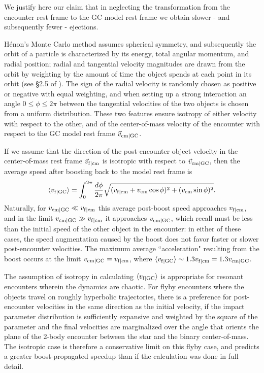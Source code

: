 \documentclass[twocolumn,linenumbers]{aastex631}
\begin{document}
We justify here our claim that in neglecting the transformation from the encounter rest frame to the GC model rest frame we obtain slower - and subsequently fewer - ejections.

H\'enon's Monte Carlo method assumes spherical symmetry, and subsequently the orbit of a particle is characterized by its energy, total angular momentum, and radial position; radial and tangential velocity magnitudes are drawn from the orbit by weighting by the amount of time the object spends at each point in its orbit (see \S2.5 of \citet{Rodriguez2022}).
The sign of the radial velocity is randomly chosen as positive or negative with equal weighting, and when setting up a strong interaction an angle $0 \le \phi \le 2\pi$ between the tangential velocities of the two objects is chosen from a uniform distribution.
These two features ensure isotropy of either velocity with respect to the other, and of the center-of-mass velocity of the encounter with respect to the GC model rest frame $\vec{v}_{\rm cm|GC}$.

If we assume that the direction of the post-encounter object velocity in the center-of-mass rest frame $\vec{v}_{\rm f|cm}$ is isotropic with respect to $\vec{v}_{\rm cm|GC}$, then the average speed after boosting back to the model rest frame is
\begin{equation}
    \langle v_{\rm f|GC} \rangle
    = \int_0^{2\pi} \frac{d\phi}{2\pi} \sqrt{(v_{\rm f|cm} + v_{\rm cm} \cos \phi)^2 + (v_{\rm cm} \sin \phi)^2}.
\end{equation}
Naturally, for $v_{\rm cm|GC} \ll v_{\rm f|cm}$ this average post-boost speed approaches $v_{\rm f|cm}$, and in the limit $v_{\rm cm|GC} \gg v_{\rm f|cm}$ it approaches $v_{\rm cm|GC}$, which recall must be less than the initial speed of the other object in the encounter: in either of these cases, the speed augmentation caused by the boost does not favor faster or slower post-encounter velocities.
The maximum average ``acceleration" resulting from the boost occurs at the limit $v_{\rm cm|GC} = v_{\rm f|cm}$, where $\langle v_{\rm f|GC} \rangle \sim 1.3 v_{\rm f|cm} = 1.3 v_{\rm cm|GC}$.

The assumption of isotropy in calculating $\langle v_{\rm f|GC} \rangle$ is appropriate for resonant encounters wherein the dynamics are chaotic.
For flyby encounters where the objects travel on roughly hyperbolic trajectories, there is a preference for post-encounter velocities in the same direction as the initial velocity, if the impact parameter distribution is sufficiently expansive and weighted by the square of the parameter and the final velocities are marginalized over the angle that orients the plane of the 2-body encounter between the star and the binary center-of-mass.
The isotropic case is therefore a conservative limit on this flyby case, and predicts a greater boost-propagated speedup than if the calculation was done in full detail.
\end{document}
